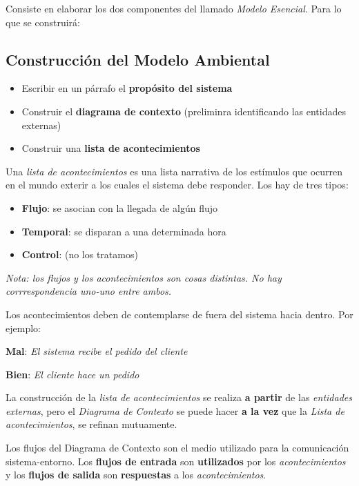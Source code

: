 Consiste en elaborar los dos componentes del llamado \textit{Modelo Esencial}. Para lo que se construirá:

\subsection{Construcción del Modelo Ambiental}

\begin{itemize}[noitemsep]
\item Escribir en un párrafo el \textbf{propósito del sistema}
\item Construir el \textbf{diagrama de contexto} (preliminra identificando las entidades externas)
\item Construir una \textbf{lista de acontecimientos}
\end{itemize}

Una \textit{lista de acontecimientos} es una lista narrativa de los estímulos que ocurren en el mundo exterir a los cuales el sistema debe responder. Los hay de tres tipos:

\begin{itemize}[noitemsep]
\item \textbf{Flujo}: se asocian con la llegada de algún flujo
\item \textbf{Temporal}: se disparan a una determinada hora
\item \textbf{Control}: (no los tratamos)
\end{itemize}

\textit{Nota: los flujos y los acontecimientos son cosas distintas. No hay corrrespondencia uno-uno entre ambos.}

Los acontecimientos deben de contemplarse de fuera del sistema hacia dentro. Por ejemplo:

\textbf{Mal}: \textit{El sistema recibe el pedido del cliente}

\textbf{Bien}: \textit{El cliente hace un pedido}

La construcción de la \textit{lista de acontecimientos} se realiza \textbf{a partir} de las \textit{entidades externas}, pero el \textit{Diagrama de Contexto} se puede hacer \textbf{a la vez} que la \textit{Lista de acontecimientos}, se refinan mutuamente.

Los flujos del Diagrama de Contexto son el medio utilizado para la comunicación sistema-entorno. Los \textbf{flujos de entrada} son \textbf{utilizados} por los \textit{acontecimientos} y los \textbf{flujos de salida} son \textbf{respuestas} a los \textit{acontecimientos}.

